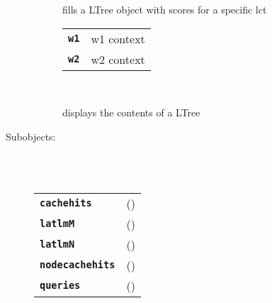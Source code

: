 \begin{description}
\begin{description}
        fills a LTree object with scores for a specific lct

      \begin{tabular}{ll}
 \texttt{\textbf{w1}} & w1 context  \\
 \texttt{\textbf{w2}} & w2 context  \\
      \end{tabular}
       \texttt{} \

        displays the contents of a LTree

    \end{description}

  \item[Subobjects:] \hfill \\
\ 
    \begin{tabular}{ll}
      \texttt{\textbf{cachehits}} & (\Jref{module}{???}) \\
      \texttt{\textbf{latlmM}} & (\Jref{module}{BMem}) \\
      \texttt{\textbf{latlmN}} & (\Jref{module}{???}) \\
      \texttt{\textbf{nodecachehits}} & (\Jref{module}{???}) \\
      \texttt{\textbf{queries}} & (\Jref{module}{???}) \\
    \end{tabular}
\vspace{3mm}

\end{description}

